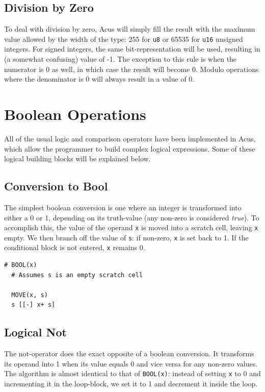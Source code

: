 \subsection{Division by Zero}\label{sec:compilation:divby0}
To deal with division by zero, Acus will simply fill the result with the maximum value allowed by the width of the type: 255 for \texttt{u8} or 65535 for \texttt{u16} unsigned integers. For signed integers, the same bit-representation will be used, resulting in (a somewhat confusing) value of -1. The exception to this rule is when the numerator is 0 as well, in which case the result will become 0. Modulo operations where the denominator is 0 will always result in a value of 0.

\section{Boolean Operations}
\label{sec:compilation:logic}
All of the usual logic and comparison operators have been implemented in Acus, which allow the programmer to build complex logical expressions. Some of these logical building blocks will be explained below.

\subsection{Conversion to Bool}
\label{sec:compilation:boolconversion}
The simplest boolean conversion is one where an integer is transformed into either a 0 or 1, depending on its truth-value (any non-zero is considered \emph{true}). To accomplish this, the value of the operand \texttt{x} is moved into a scratch cell, leaving \texttt{x} empty. We then branch off the value of \texttt{s}: if non-zero, \texttt{x} is set back to 1. If the conditional block is not entered, \texttt{x} remains 0.

\vspace{0.5cm}\noindent\begin{minipage}{\linewidth}
\begin{lstlisting}[style=brainfuck]
  # BOOL(x)
  # Assumes s is an empty scratch cell
  
  MOVE(x, s)
  s [[-] x+ s]
\end{lstlisting}
\end{minipage}

\subsection{Logical Not}
\label{sec:compilation:logicalnot}
The not-operator does the exact opposite of a boolean conversion. It transforms its operand into 1 when its value equals 0 and vice versa for any non-zero values. The algorithm is almost identical to that of \texttt{BOOL(x)}: instead of setting \texttt{x} to 0 and incrementing it in the loop-block, we set it to 1 and decrement it inside the loop.

